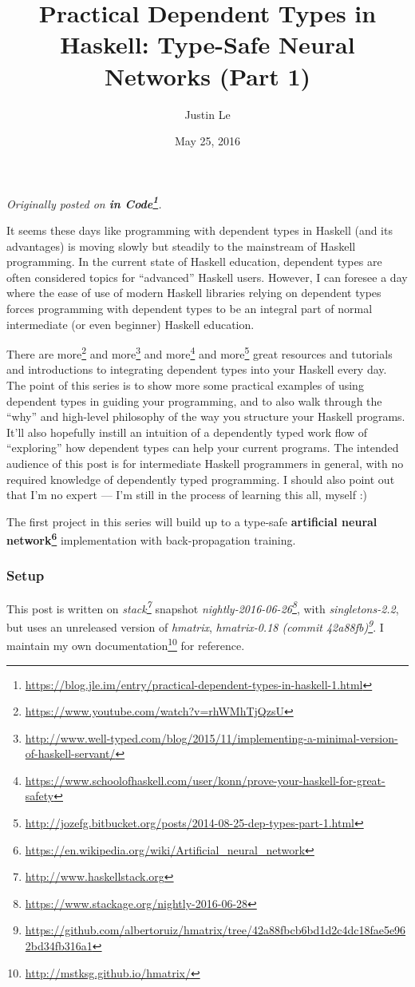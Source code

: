 \documentclass[]{article}
\title{Practical Dependent Types in Haskell: Type-Safe Neural Networks (Part 1)}
\author{Justin Le}
\date{May 25, 2016}
\renewcommand{\href}[2]{#2\footnote{\url{#1}}}
\begin{document}
\maketitle

\emph{Originally posted on
\textbf{\href{https://blog.jle.im/entry/practical-dependent-types-in-haskell-1.html}{in
Code}}.}

It seems these days like programming with dependent types in Haskell (and its
advantages) is moving slowly but steadily to the mainstream of Haskell
programming. In the current state of Haskell education, dependent types are
often considered topics for ``advanced'' Haskell users. However, I can foresee a
day where the ease of use of modern Haskell libraries relying on dependent types
forces programming with dependent types to be an integral part of normal
intermediate (or even beginner) Haskell education.

There are \href{https://www.youtube.com/watch?v=rhWMhTjQzsU}{more} and
\href{http://www.well-typed.com/blog/2015/11/implementing-a-minimal-version-of-haskell-servant/}{more}
and
\href{https://www.schoolofhaskell.com/user/konn/prove-your-haskell-for-great-safety}{more}
and
\href{http://jozefg.bitbucket.org/posts/2014-08-25-dep-types-part-1.html}{more}
great resources and tutorials and introductions to integrating dependent types
into your Haskell every day. The point of this series is to show more some
practical examples of using dependent types in guiding your programming, and to
also walk through the ``why'' and high-level philosophy of the way you structure
your Haskell programs. It'll also hopefully instill an intuition of a
dependently typed work flow of ``exploring'' how dependent types can help your
current programs. The intended audience of this post is for intermediate Haskell
programmers in general, with no required knowledge of dependently typed
programming. I should also point out that I'm no expert --- I'm still in the
process of learning this all, myself :)

The first project in this series will build up to a type-safe
\textbf{\href{https://en.wikipedia.org/wiki/Artificial_neural_network}{artificial
neural network}} implementation with back-propagation training.

\subsubsection{Setup}\label{setup}

This post is written on \emph{\href{http://www.haskellstack.org}{stack}}
snapshot
\emph{\href{https://www.stackage.org/nightly-2016-06-28}{nightly-2016-06-26}},
with \emph{singletons-2.2}, but uses an unreleased version of \emph{hmatrix},
\emph{\href{https://github.com/albertoruiz/hmatrix/tree/42a88fbcb6bd1d2c4dc18fae5e962bd34fb316a1}{hmatrix-0.18
(commit 42a88fb)}}. I \href{http://mstksg.github.io/hmatrix/}{maintain my own
documentation} for reference.
\end{document}
